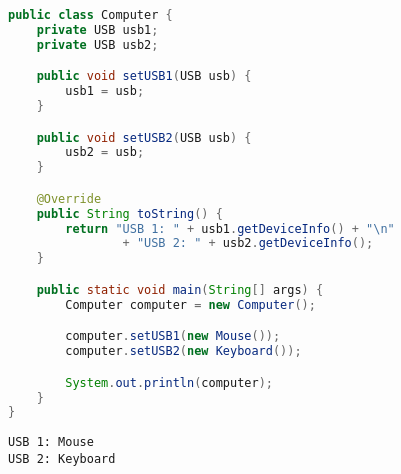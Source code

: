\begin{lstlisting}[language=Java]
public class Computer {
    private USB usb1;
    private USB usb2;

    public void setUSB1(USB usb) {
        usb1 = usb;
    }

    public void setUSB2(USB usb) {
        usb2 = usb;
    }

    @Override
    public String toString() {
        return "USB 1: " + usb1.getDeviceInfo() + "\n"
                + "USB 2: " + usb2.getDeviceInfo();
    }

    public static void main(String[] args) {
        Computer computer = new Computer();

        computer.setUSB1(new Mouse());
        computer.setUSB2(new Keyboard());

        System.out.println(computer);
    }
}
\end{lstlisting}

\begin{tcolorbox}
    \begin{verbatim}
USB 1: Mouse
USB 2: Keyboard
	\end{verbatim}
\end{tcolorbox}

\newpage